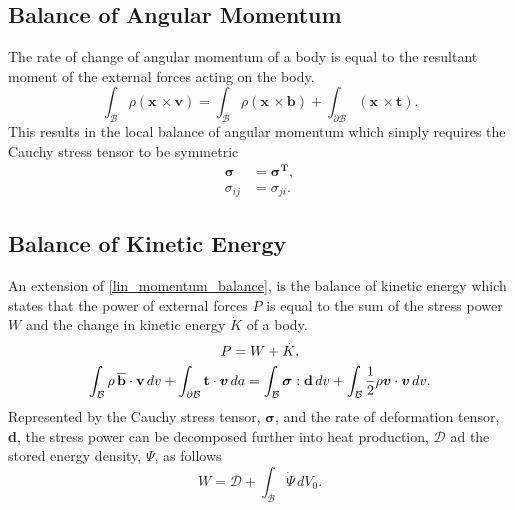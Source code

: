 \subsection{Balance of Angular Momentum}
The rate of change of angular momentum of a body is equal to the resultant moment of the external forces acting on the body.
\begin{equation}\label{angular_momentum}
    \int_{\mathcal{B}} \rho(\boldsymbol{x}\, \times \boldsymbol{v}) = \int_{\mathcal{B}} \rho(\boldsymbol{x}\, \times \boldsymbol{b}) + \int_{\partial\mathcal{B}} (\boldsymbol{x}\, \times \boldsymbol{t}).
\end{equation}
This results in the local balance of angular momentum which simply requires the Cauchy stress tensor to be symmetric
\begin{align} \label{cauchy_stress_sym}
    \boldsymbol{\sigma} &= \boldsymbol{\sigma ^{T}},\\
    \sigma _{ij} &= \sigma _{ji}.
\end{align}
\subsection{Balance of Kinetic Energy}
An extension of \eqref{lin_momentum_balance}, is the balance of kinetic energy which states that the power of external forces $P$
 is equal to the sum of the stress power $W$ and the change in kinetic energy $\dot{K}$ of a body.
\begin{gather}\label{kin_energy}
    P = W + \dot{K},\\
    \int_{\mathcal{B}} \rho \,\boldsymbol{\overline{\mathrm{b}}} \cdot \boldsymbol{\mathrm{v}} \, dv + \int_{\partial \mathcal{B}} \boldsymbol{\mathrm{t}} \cdot \mathrm{\boldsymbol{v}} \, da =
    \int_{\mathcal{B}} \boldsymbol{\sigma} : \boldsymbol{\mathrm{d}} \,dv + \int_{\mathcal{B}} \frac{1}{2} \rho \mathrm{\boldsymbol{v}} \cdot \mathrm{\boldsymbol{v}} \, dv. \notag
\end{gather}
Represented by the Cauchy stress tensor, $\boldsymbol{\sigma}$, and the rate of deformation tensor, \textbf{d},
 the stress power can be decomposed further into heat production, $\mathcal{D}$ ad the stored energy density, $\Psi$, as follows
\begin{equation}\label{stress_power}
    W = \mathcal{D} + \int_{\mathcal{B}} \dot{\Psi}\,dV_{0}.
\end{equation} 
